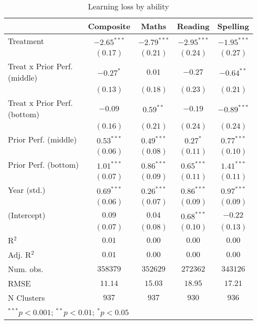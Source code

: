 
\begin{table}
\begin{center}
\begin{tabular}{l c c c c}
\hline
 & Composite & Maths & Reading & Spelling \\
\hline
Treatment                    & $-2.65^{***}$ & $-2.79^{***}$ & $-2.95^{***}$ & $-1.95^{***}$ \\
                             & $(0.17)$      & $(0.21)$      & $(0.24)$      & $(0.27)$      \\
Treat x Prior Perf. (middle) & $-0.27^{*}$   & $0.01$        & $-0.27$       & $-0.64^{**}$  \\
                             & $(0.13)$      & $(0.18)$      & $(0.23)$      & $(0.21)$      \\
Treat x Prior Perf. (bottom) & $-0.09$       & $0.59^{**}$   & $-0.19$       & $-0.89^{***}$ \\
                             & $(0.16)$      & $(0.21)$      & $(0.24)$      & $(0.24)$      \\
Prior Perf. (middle)         & $0.53^{***}$  & $0.49^{***}$  & $0.27^{*}$    & $0.77^{***}$  \\
                             & $(0.06)$      & $(0.08)$      & $(0.11)$      & $(0.10)$      \\
Prior Perf. (bottom)         & $1.01^{***}$  & $0.86^{***}$  & $0.65^{***}$  & $1.41^{***}$  \\
                             & $(0.07)$      & $(0.09)$      & $(0.11)$      & $(0.11)$      \\
Year (std.)                  & $0.69^{***}$  & $0.26^{***}$  & $0.86^{***}$  & $0.97^{***}$  \\
                             & $(0.06)$      & $(0.07)$      & $(0.09)$      & $(0.09)$      \\
(Intercept)                  & $0.09$        & $0.04$        & $0.68^{***}$  & $-0.22$       \\
                             & $(0.07)$      & $(0.08)$      & $(0.10)$      & $(0.13)$      \\
\hline
R$^2$                        & $0.01$        & $0.00$        & $0.00$        & $0.00$        \\
Adj. R$^2$                   & $0.01$        & $0.00$        & $0.00$        & $0.00$        \\
Num. obs.                    & $358379$      & $352629$      & $272362$      & $343126$      \\
RMSE                         & $11.14$       & $15.03$       & $18.95$       & $17.21$       \\
N Clusters                   & $937$         & $937$         & $930$         & $936$         \\
\hline
\multicolumn{5}{l}{\scriptsize{$^{***}p<0.001$; $^{**}p<0.01$; $^{*}p<0.05$}}
\end{tabular}
\caption{Learning loss by ability}
\label{tableability}
\end{center}
\end{table}
